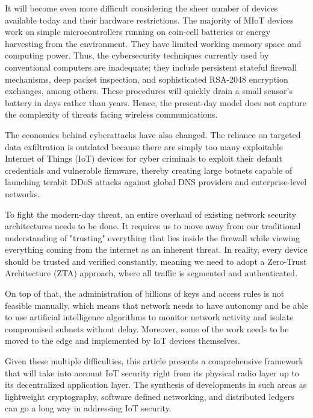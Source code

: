 \documentclass[12pt]{article}
\begin{document}
    It will become even more difficult considering the sheer number of devices available today and their hardware restrictions. The majority of MIoT devices work on simple microcontrollers running on coin-cell batteries or energy harvesting from the environment. They have limited working memory space and computing power. Thus, the cybersecurity techniques currently used by conventional computers are inadequate; they include persistent stateful firewall mechanisms, deep packet inspection, and sophisticated RSA-2048 encryption exchanges, among others. These procedures will quickly drain a small sensor's battery in days rather than years. Hence, the present-day model does not capture the complexity of threats facing wireless communications.

    The economics behind cyberattacks have also changed. The reliance on targeted data exfiltration is outdated because there are simply too many exploitable Internet of Things (IoT) devices for cyber criminals to exploit their default credentials and vulnerable firmware, thereby creating large botnets capable of launching terabit DDoS attacks against global DNS providers and enterprise-level networks.

    To fight the modern-day threat, an entire overhaul of existing network security architectures needs to be done. It requires us to move away from our traditional understanding of "trusting" everything that lies inside the firewall while viewing everything coming from the internet as an inherent threat. In reality, every device should be trusted and verified constantly, meaning we need to adopt a Zero-Trust Architecture (ZTA) approach, where all traffic is segmented and authenticated.

    On top of that, the administration of billions of keys and access rules is not feasible manually, which means that network needs to have autonomy and be able to use artificial intelligence algorithms to monitor network activity and isolate compromised subnets without delay. Moreover, some of the work needs to be moved to the edge and implemented by IoT devices themselves.
    
    Given these multiple difficulties, this article presents a comprehensive framework that will take into account IoT security right from its physical radio layer up to its decentralized application layer. The synthesis of developments in such areas as lightweight cryptography, software defined networking, and distributed ledgers can go a long way in addressing IoT security.
\end{document}
